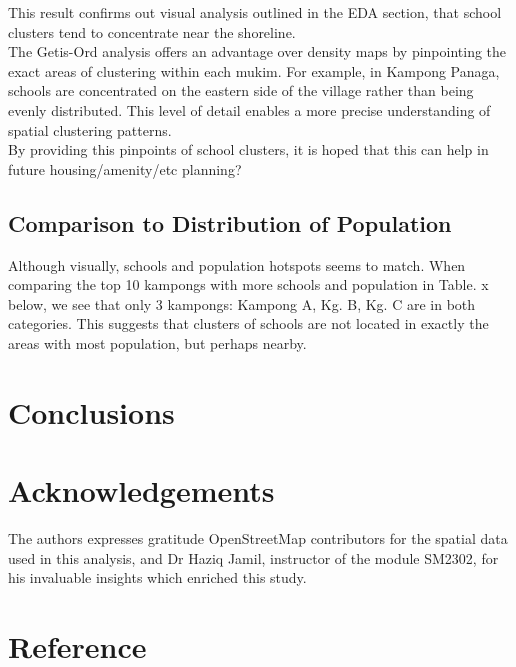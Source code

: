 \documentclass[12pt]{article}
\begin{document}
This result confirms out visual analysis outlined in the EDA section,  that school clusters tend to concentrate near the shoreline. \\

The Getis-Ord analysis offers an advantage over density maps by pinpointing the exact areas of clustering within each mukim. For example, in Kampong Panaga, schools are concentrated on the eastern side of the village rather than being evenly distributed. This level of detail enables a more precise understanding of spatial clustering patterns. \\

By providing this pinpoints of school clusters, it is hoped that this can help in future housing/amenity/etc planning? \\


\subsection{Comparison to Distribution of Population}

Although visually, schools and population hotspots seems to match. When comparing the top 10 kampongs with more schools and population in Table. x below, we see that only 3 kampongs: Kampong A, Kg. B, Kg. C are in both categories. This suggests that clusters of schools are not located in exactly the areas with most population, but perhaps nearby. 


\section{Conclusions}

\section{Acknowledgements}
 The authors expresses gratitude OpenStreetMap contributors for the spatial data used in this analysis, and Dr Haziq Jamil, instructor of the module SM2302, for his invaluable insights
 which enriched this study.
 
\section{Reference}
\end{document}
